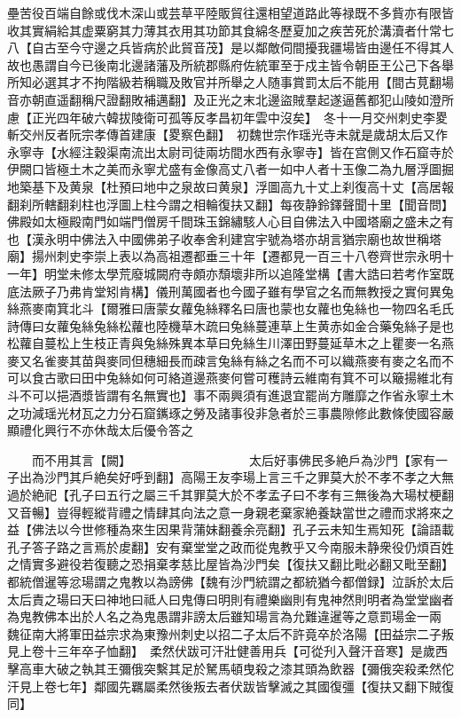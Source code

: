 壘苦役百端自餘或伐木深山或芸草平陸販貿往還相望道路此等禄既不多貲亦有限皆收其實絹給其虚粟窮其力薄其衣用其功節其食綿冬歷夏加之疾苦死於溝瀆者什常七八【自古至今守邊之兵皆病於此貿音茂】是以鄰敵伺間擾我疆場皆由邊任不得其人故也愚謂自今已後南北邊諸藩及所統郡縣府佐統軍至于戍主皆令朝臣王公己下各舉所知必選其才不拘階級若稱職及敗官并所舉之人随事賞罰太后不能用【間古莧翻場音亦朝直遥翻稱尺證翻敗補邁翻】及正光之末北邊盜賊羣起遂逼舊都犯山陵如澄所慮【正光四年破六韓拔陵衛可孤等反孝昌初年雲中沒矣】　冬十一月交州刺史李畟斬交州反者阮宗孝傳首建康【畟察色翻】　初魏世宗作瑶光寺未就是歲胡太后又作永寧寺【水經注穀渠南流出太尉司徒兩坊間水西有永寧寺】皆在宫側又作石窟寺於伊闕口皆極土木之美而永寧尤盛有金像高丈八者一如中人者十玉像二為九層浮圖掘地築基下及黄泉【杜預曰地中之泉故曰黄泉】浮圖高九十丈上刹復高十丈【高居報翻刹所轄翻刹柱也浮圖上柱今謂之相輪復扶又翻】每夜静鈴鐸聲聞十里【聞音問】佛殿如太極殿南門如端門僧房千間珠玉錦繡駭人心目自佛法入中國塔廟之盛未之有也【漢永明中佛法入中國佛弟子收奉舍利建宫宇號為塔亦胡言猶宗廟也故世稱塔廟】揚州刺史李崇上表以為高祖遷都垂三十年【遷都見一百三十八卷齊世宗永明十一年】明堂未修太學荒廢城闕府寺頗亦頹壞非所以追隆堂構【書大誥曰若考作室既底法厥子乃弗肯堂矧肯構】儀刑萬國者也今國子雖有學官之名而無教授之實何異兔絲燕麥南箕北斗【爾雅曰唐蒙女蘿兔絲釋名曰唐也蒙也女蘿也兔絲也一物四名毛氏詩傳曰女蘿兔絲兔絲松蘿也陸機草木疏曰兔絲蔓連草上生黄赤如金合藥兔絲子是也松蘿自蔓松上生枝正青與兔絲殊異本草曰免絲生川澤田野蔓延草木之上瞿麥一名燕麥又名雀麥其苗與麥同但穗細長而疎言兔絲有絲之名而不可以織燕麥有麥之名而不可以食古歌曰田中兔絲如何可絡道邊燕麥何嘗可穫詩云維南有箕不可以簸揚維北有斗不可以挹酒漿皆謂有名無實也】事不兩興須有進退宜罷尚方雕靡之作省永寧土木之功減瑶光材瓦之力分石窟䥴琢之勞及諸事役非急者於三事農隙修此數條使國容嚴顯禮化興行不亦休哉太后優令答之

　　而不用其言【闕】　　　　　　　　　　太后好事佛民多絶戶為沙門【家有一子出為沙門其戶絶矣好呼到翻】高陽王友李瑒上言三千之罪莫大於不孝不孝之大無過於絶祀【孔子曰五行之屬三千其罪莫大於不孝孟子曰不孝有三無後為大瑒杖梗翻又音暢】豈得輕縱背禮之情肆其向法之意一身親老棄家絶養缺當世之禮而求將來之益【佛法以今世修種為來生因果背蒲妹翻養余亮翻】孔子云未知生焉知死【論語載孔子答子路之言焉於䖍翻】安有棄堂堂之政而從鬼教乎又今南服未静衆役仍煩百姓之情實多避役若復聽之恐捐棄孝慈比屋皆為沙門矣【復扶又翻比毗必翻又毗至翻】都統僧暹等忿瑒謂之鬼教以為謗佛【魏有沙門統謂之都統猶今都僧録】泣訴於太后太后責之瑒曰天曰神地曰祗人曰鬼傳曰明則有禮樂幽則有鬼神然則明者為堂堂幽者為鬼教佛本出於人名之為鬼愚謂非謗太后雖知瑒言為允難違暹等之意罰瑒金一兩　魏征南大將軍田益宗求為東豫州刺史以招二子太后不許竟卒於洛陽【田益宗二子叛見上卷十三年卒子恤翻】　柔然伏跋可汗壯健善用兵【可從刋入聲汗音寒】是歲西擊高車大破之執其王彌俄突繫其足於駑馬頓曳殺之漆其頭為飲器【彌俄突殺柔然佗汗見上卷七年】鄰國先羈屬柔然後叛去者伏跋皆擊滅之其國復彊【復扶又翻下賊復同】

